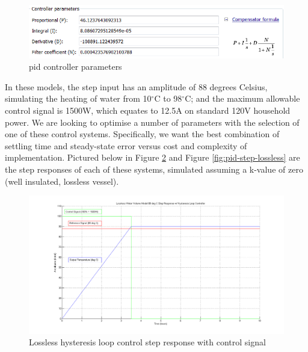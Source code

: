 \documentclass{article}
\begin{document}
\begin{figure}[H]
\begin{center}
\includegraphics[scale=0.80]{pid-parameters.png}
\caption{\gls{pid} controller parameters}
\label{fig:pid-parameters}
\end{center}
\end{figure}

In these models, the step input has an amplitude of 88 degrees Celsius, simulating the heating of water from 10$^{\circ}$C to 98$^{\circ}$C; and the maximum allowable control signal is 1500W, which equates to 12.5A on standard 120V household power. We are looking to optimise a number of parameters with the selection of one of these control systems. Specifically, we want the best combination of settling time and steady-state error versus cost and complexity of implementation. Pictured below in Figure \ref{fig:hysteresis-step-lossless} and Figure \ref{fig:pid-step-lossless} are the step responses of each of these systems, simulated assuming a k-value of zero (well insulated, lossless vessel).

\begin{figure}[H]
\begin{center}
\includegraphics[scale=0.35]{hysteresis-step-lossless.png}
\caption{Lossless hysteresis loop control step response with control signal}
\label{fig:hysteresis-step-lossless}
\end{center}
\end{figure}
\end{document}
